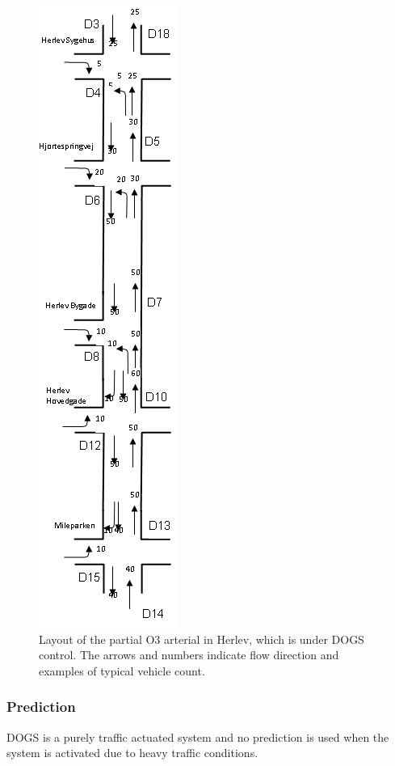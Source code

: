 \begin{figure}[!ht]
\begin{center}
\includegraphics[scale=0.5,angle=90]{dogs_herlev.png} 
\end{center}
\caption{Layout of the partial O3 arterial in Herlev, which is under DOGS control. The arrows and numbers indicate flow direction and examples of typical vehicle count.}
\label{fig:dogs_herlev}
\end{figure}

\subsubsection*{Prediction}

DOGS is a purely traffic actuated system and no prediction is used
when the system is activated due to heavy traffic conditions.

